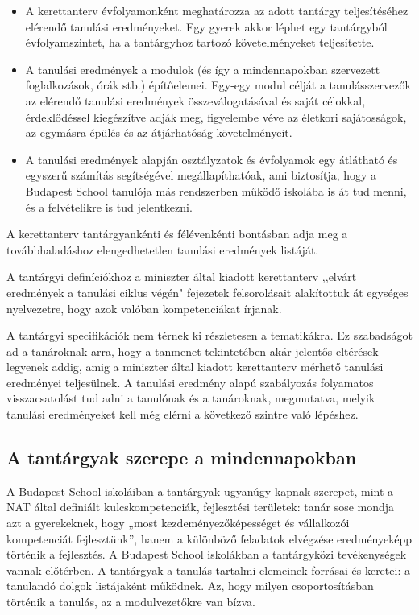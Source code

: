 \begin{itemize}

      \item A kerettanterv évfolyamonként meghatározza az adott tantárgy teljesítéséhez elérendő tanulási eredményeket. Egy gyerek akkor  léphet egy tantárgyból évfolyamszintet, ha a tantárgyhoz tartozó követelményeket teljesítette.

      \item A tanulási eredmények a modulok (és így a mindennapokban szervezett foglalkozások, órák stb.) építőelemei. Egy-egy modul célját a  tanulásszervezők az elérendő tanulási eredmények	összeválogatásával és saját célokkal, érdeklődéssel kiegészítve adják meg, figyelembe véve az életkori  sajátosságok, az egymásra épülés és az átjárhatóság  követelményeit.
      \item A tanulási eredmények alapján osztályzatok és évfolyamok egy átlátható és egyszerű számítás segítségével megállapíthatóak, ami biztosítja, hogy a Budapest  School tanulója más rendszerben működő iskolába is át tud menni, és a felvételikre is tud jelentkezni.
\end{itemize}

A kerettanterv tantárgyankénti és félévenkénti bontásban adja meg a továbbhaladáshoz elengedhetetlen tanulási eredmények listáját.

A tantárgyi definíciókhoz a miniszter által kiadott kerettanterv ,,elvárt eredmények a tanulási ciklus végén" fejezetek felsorolásait alakítottuk át egységes nyelvezetre, hogy azok valóban kompetenciákat írjanak.

A tantárgyi specifikációk nem térnek ki rész\-letesen a tematikákra. Ez szabadságot ad a tanároknak arra, hogy a tanmenet tekintetében akár jelentős eltérések legyenek addig, amig a miniszter által kiadott kerettanterv mérhető tanulási eredményei teljesülnek. A tanulási eredmény alapú szabályozás folyamatos visszacsatolást tud adni a tanulónak és a tanároknak, megmutatva, melyik tanulási eredményeket kell még elérni a következő szintre való lépéshez.

\subsection{A tantárgyak szerepe a mindennapokban}
A Budapest School iskoláiban a tantárgyak ugyanúgy kapnak szerepet, mint a NAT által definiált kulcskompetenciák, fejlesztési területek: tanár sose mondja azt a gyerekeknek, hogy „most kezdeményezőképességet és vállalkozói kompetenciát fejlesztünk'', hanem a különböző feladatok elvégzése eredményeképp történik a fejlesztés. A Budapest School iskolákban a tantárgyközi tevékenységek vannak előtérben. A tantárgyak a tanulás tartalmi elemeinek forrásai és keretei: a tanulandó dolgok listájaként működnek. Az, hogy milyen csoportosításban történik a tanulás, az a modulvezetőkre van bízva.

